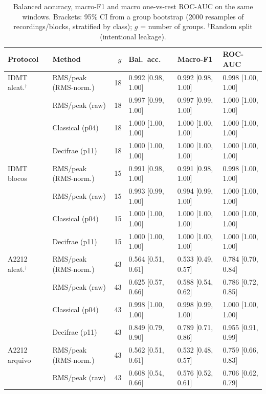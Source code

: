 \begin{table}[t]
\centering
\scriptsize
\caption{Balanced accuracy, macro-F1 and macro one-vs-rest ROC-AUC on the same windows. Brackets: 95\% CI from a group bootstrap (2000 resamples of recordings/blocks, stratified by class); $g$ = number of groups. $^\dagger$Random split (intentional leakage).}
\label{tab:desempenho}
\begin{tabular}{llrlll}
\toprule
Protocol & Method & $g$ & Bal.\ acc. & Macro-F1 & ROC-AUC \\
\midrule
IDMT aleat.$^\dagger$ & RMS/peak (RMS-norm.) & 18 & 0.992 [0.98, 1.00] & 0.992 [0.98, 1.00] & 0.998 [1.00, 1.00] \\
 & RMS/peak (raw) & 18 & 0.997 [0.99, 1.00] & 0.997 [0.99, 1.00] & 1.000 [1.00, 1.00] \\
 & Classical (p04) & 18 & 1.000 [1.00, 1.00] & 1.000 [1.00, 1.00] & 1.000 [1.00, 1.00] \\
 & Decifrae (p11) & 18 & 1.000 [1.00, 1.00] & 1.000 [1.00, 1.00] & 1.000 [1.00, 1.00] \\
\midrule
IDMT blocos & RMS/peak (RMS-norm.) & 15 & 0.991 [0.98, 1.00] & 0.991 [0.98, 1.00] & 0.998 [1.00, 1.00] \\
 & RMS/peak (raw) & 15 & 0.993 [0.99, 1.00] & 0.994 [0.99, 1.00] & 1.000 [1.00, 1.00] \\
 & Classical (p04) & 15 & 1.000 [1.00, 1.00] & 1.000 [1.00, 1.00] & 1.000 [1.00, 1.00] \\
 & Decifrae (p11) & 15 & 1.000 [1.00, 1.00] & 1.000 [1.00, 1.00] & 1.000 [1.00, 1.00] \\
\midrule
A2212 aleat.$^\dagger$ & RMS/peak (RMS-norm.) & 43 & 0.564 [0.51, 0.61] & 0.533 [0.49, 0.57] & 0.784 [0.70, 0.84] \\
 & RMS/peak (raw) & 43 & 0.625 [0.57, 0.66] & 0.588 [0.54, 0.62] & 0.786 [0.72, 0.85] \\
 & Classical (p04) & 43 & 0.998 [1.00, 1.00] & 0.998 [0.99, 1.00] & 1.000 [1.00, 1.00] \\
 & Decifrae (p11) & 43 & 0.849 [0.79, 0.90] & 0.789 [0.71, 0.86] & 0.955 [0.91, 0.99] \\
\midrule
A2212 arquivo & RMS/peak (RMS-norm.) & 43 & 0.562 [0.51, 0.61] & 0.532 [0.48, 0.57] & 0.759 [0.66, 0.83] \\
 & RMS/peak (raw) & 43 & 0.608 [0.54, 0.66] & 0.576 [0.52, 0.61] & 0.706 [0.62, 0.79] \\

\end{tabular}
\end{table}
